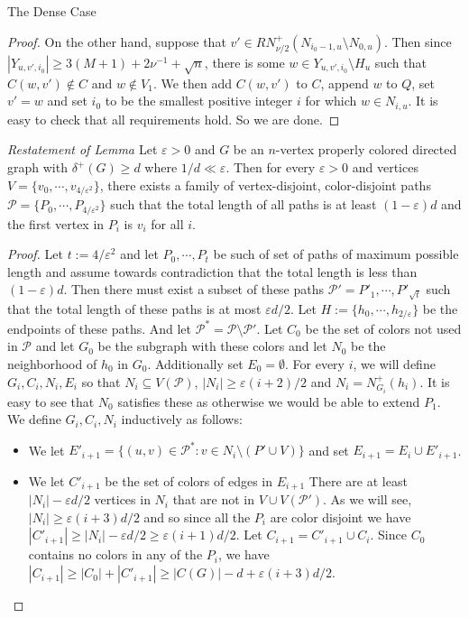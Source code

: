 \documentclass[11pt,a4paper]{article}
\newcommand{\vep}{\varepsilon}
\begin{document}
\begin{section}{The Dense Case}
\begin{proof}
On the other hand, suppose that $v' \in RN^+_{\nu/2} (N_{i_0 - 1, u } \setminus N_{0, u} )$. Then since $|Y_{u, v', i_0}| \geq 3(M + 1) + 2 \nu^{-1} + \sqrt n$, there is some $w \in Y_{u, v', i_0} \setminus H_u$ such that $C(w, v') \not \in C$ and $w \not \in V_1$. We then add $C(w, v')$ to $C$, append $w$ to $Q$, set $v' = w$ and set $i_0$ to be the smallest positive integer $i$ for which $w \in N_{i, u}$. It is easy to check that all requirements hold. So we are done.
\end{proof}
\textit{Restatement of Lemma \label{path_forest}} Let $\vep > 0$ and $G$ be an $n$-vertex properly colored directed graph  with $\delta^+(G) \geq d$ where $1/d \ll \vep$. Then for every $\vep > 0$ and vertices $V = \{v_0, \cdots, v_{4/\vep^2} \}$, there exists a family of vertex-disjoint, color-disjoint paths $\mathcal P = \{ P_0, \cdots, P_{4/\vep^2} \}$ such that the total length of all paths is at least $(1 - \vep) d$ and the first vertex in $P_i$ is $v_i$ for all $i$.
\begin{proof}
Let $t := 4/\vep^2$ and let $P_0, \cdots, P_{t}$ be such of set of paths of maximum possible length and assume towards contradiction that the total length is less than $(1 - \vep)d$. Then there must exist a subset of these paths $\mathcal P' = P'_1, \cdots, P'_{\sqrt t}$ such that the total length of these paths is at most $\vep d/2$. Let $H := \{h_0, \cdots, h_{2/\vep} \}$ be the endpoints of these paths. And let $\mathcal P^* = \mathcal P \setminus \mathcal P'$. Let $C_0$ be the set of colors not used in $\mathcal P$ and let $G_0$ be the subgraph with these colors and let $N_0$ be the neighborhood of $h_0$ in $G_0$. Additionally set $E_0 = \emptyset$. For every $i$, we will define $G_i, C_i, N_i, E_i$ so that $N_i \subseteq V(\mathcal P)$, $|N_i| \geq \vep (i + 2) /2 $ and $N_i = N^+_{G_i}(h_i)$. It is easy to see that $N_0$ satisfies these as otherwise we would be able to extend $P_1$. We define $G_i, C_i, N_i$ inductively as follows:
\begin{itemize}
	\item We let $E'_{i + 1} = \{ (u, v) \in \mathcal P^{*} : v \in N_{i} \setminus (P' \cup V) \}$ and set $E_{i + 1} = E_{i} \cup E'_{i + 1}$.
	\item We let $C'_{i + 1}$ be the set of colors of edges in $E_{i + 1}$
		There are at least $|N_i| - \vep d/2$ vertices in $N_i$ that are not in $V \cup V(\mathcal P')$. As we will see, $|N_i| \geq \vep(i + 3) d/2$ and so since all the $P_i$ are color disjoint we have $|C'_{i + 1}| \geq |N_i| - \vep d/2 \geq \vep (i + 1) d/2$. Let $C_{i + 1} = C'_{i + 1} \cup C_i$. Since $C_0$ contains no colors in any of the $P_i$, we have $|C_{i + 1}| \geq |C_0| + |C'_{i + 1}| \geq |C(G)| - d + \vep(i + 3) d/2$.

\end{itemize}
\end{proof}
\end{section}
\end{document}
